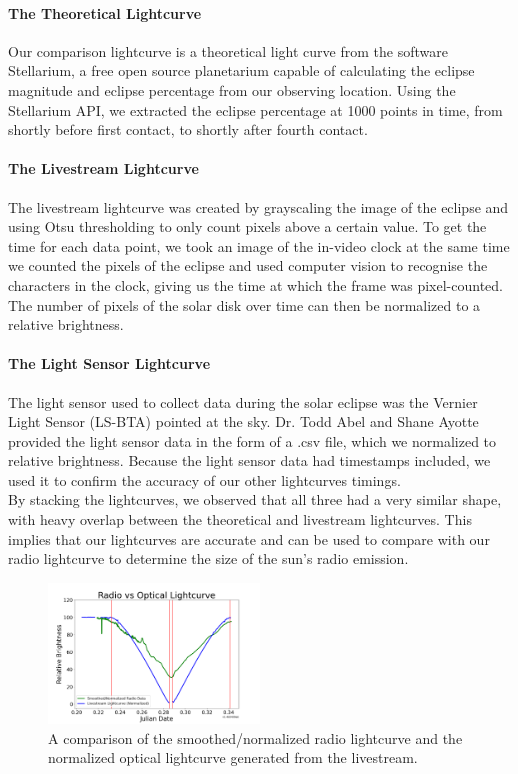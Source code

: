 \paragraph{The Theoretical Lightcurve}
Our comparison lightcurve is a theoretical light curve from the software Stellarium, a free open source planetarium capable of calculating the eclipse magnitude and eclipse percentage from our observing location.
Using the Stellarium API, we extracted the eclipse percentage at 1000 points in time, from shortly before first contact, to shortly after fourth contact.
\paragraph{The Livestream Lightcurve}
The livestream lightcurve was created by grayscaling the image of the eclipse and using Otsu thresholding to only count pixels above a certain value.
To get the time for each data point, we took an image of the in-video clock at the same time we counted the pixels of the eclipse and used computer vision to recognise the characters in the clock, giving us the time at which the frame was pixel-counted.
The number of pixels of the solar disk over time can then be normalized to a relative brightness.
\paragraph{The Light Sensor Lightcurve}
The light sensor used to collect data during the solar eclipse was the Vernier Light Sensor (LS-BTA) pointed at the sky.
Dr. Todd Abel and Shane Ayotte provided the light sensor data in the form of a .csv file, which we normalized to relative brightness.
Because the light sensor data had timestamps included, we used it to confirm the accuracy of our other lightcurves timings.
\\
By stacking the lightcurves, we observed that all three had a very similar shape, with heavy overlap between the theoretical and livestream lightcurves.
This implies that our lightcurves are accurate and can be used to compare with our radio lightcurve to determine the size of the sun’s radio emission.
\\
\begin{figure}
    \includegraphics[width=0.5\textwidth]{figures/radioOpticalComparison}
    \caption{\label{fig:radioOpticalComparison} A comparison of the smoothed/normalized radio lightcurve and the normalized optical lightcurve generated from the livestream.}
\end{figure}